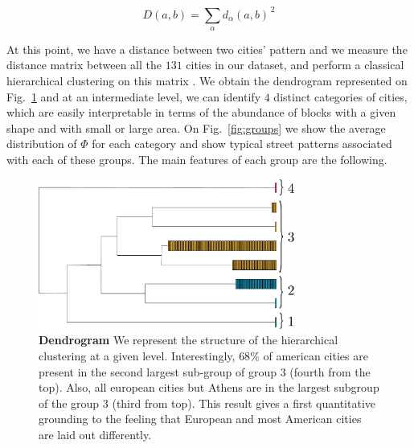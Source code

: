 \begin{equation} 
    D(a,b)= \sum_\alpha d_\alpha(a,b)^{\,2} 
\end{equation} 

At this
point, we have a distance between two cities' pattern and we measure the
distance matrix between all the $131$ cities in our dataset, and perform a
classical hierarchical clustering on this matrix \cite{Kaufman:2009}. We
obtain the dendrogram represented on Fig.~\ref{fig:dendrogram} and at an
intermediate level, we can identify $4$ distinct categories of cities, which
are easily interpretable in terms of the abundance of blocks with a given
shape and with small or large area. On Fig.~\ref{fig:groups} we show the
average distribution of $\Phi$ for each category and show typical street
patterns associated with each of these groups. The main features of each
group are the following.  

\begin{figure}
    \includegraphics[width=0.75\textwidth]{./gfx/chapter-networks/dendrogram.pdf}
    \caption{{\bf Dendrogram} We represent the structure of the hierarchical
    clustering at a given level. Interestingly, $68\%$ of american cities are
    present in the second largest sub-group of group $3$ (fourth from the top).
    Also, all european cities but Athens are in the largest subgroup of the group
    $3$ (third from top). This result gives a first quantitative grounding to the
    feeling that European and most American cities are laid out
    differently.\label{fig:dendrogram}} 
\end{figure}

